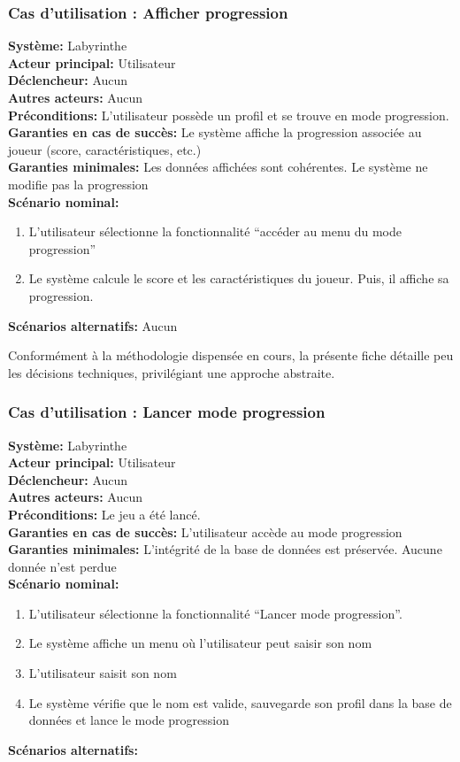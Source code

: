 \documentclass{butexFR}
\begin{document}
\subsubsection{Cas d'utilisation : Afficher progression}
\textbf{Système:} Labyrinthe\\
\textbf{Acteur principal:} Utilisateur\\
\textbf{Déclencheur:} Aucun\\
\textbf{Autres acteurs:} Aucun\\[0.25em]
\textbf{Préconditions:} L'utilisateur possède un profil et se trouve en mode progression.\\
\textbf{Garanties en cas de succès:} Le système affiche la progression associée au joueur
(score, caractéristiques, etc.)\\
\textbf{Garanties minimales:} Les données affichées sont cohérentes. Le système ne modifie pas la progression\\[0.25em]
\textbf{Scénario nominal:}
\begin{enumerate}
    \item L'utilisateur sélectionne la fonctionnalité ``accéder au menu du mode progression''
    \item Le système calcule le score et les caractéristiques du joueur. Puis, il affiche sa progression.
\end{enumerate}
\textbf{Scénarios alternatifs:} Aucun

\smallskip
{}
Conformément à la méthodologie dispensée en cours, la présente fiche détaille peu les décisions techniques, privilégiant une approche abstraite.

\newpage

\subsubsection{Cas d'utilisation : Lancer mode progression}
\textbf{Système:} Labyrinthe\\
\textbf{Acteur principal:} Utilisateur\\
\textbf{Déclencheur:} Aucun\\
\textbf{Autres acteurs:} Aucun\\[0.25em]
\textbf{Préconditions:} Le jeu a été lancé.\\
\textbf{Garanties en cas de succès:} L'utilisateur accède au mode progression\\
\textbf{Garanties minimales:} L'intégrité de la base de données est préservée. Aucune donnée n'est perdue\\[0.25em]
\textbf{Scénario nominal:}
\begin{enumerate}
    \item L'utilisateur sélectionne la fonctionnalité ``Lancer mode progression''.
    \item Le système affiche un menu où l'utilisateur peut saisir son nom
    \item L'utilisateur saisit son nom
    \item Le système vérifie que le nom est valide, sauvegarde son profil dans la base de données et lance le mode progression
\end{enumerate}
\textbf{Scénarios alternatifs:}
\end{document}
